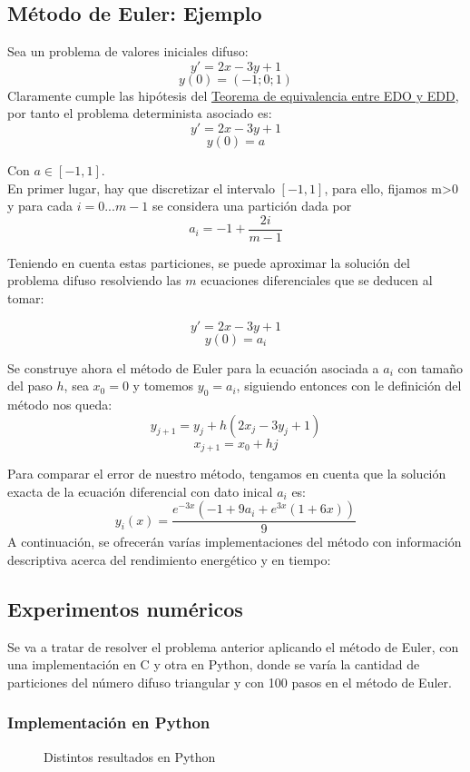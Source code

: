 \subsection{Método de Euler: Ejemplo}
\begin{ejemplo}
Sea un problema de valores iniciales difuso:
\[
y' = 2x - 3y + 1
\]
\[
y(0) = (-1;0;1)
\]
Claramente cumple las hipótesis del \hyperref[teorema:equivalencia]{Teorema de equivalencia entre EDO y EDD}, por tanto el problema determinista asociado es:
\[
y' = 2x - 3y + 1
\]
\[
y(0) = a
\]

Con $a \in [-1, 1]$. \\
En primer lugar, hay que discretizar el intervalo $[-1, 1]$, para ello, fijamos m>0 y para cada $i=0...m-1$ se considera una partición dada por 
\[
a_i = -1 + \frac{2i}{m-1}
\]

Teniendo en cuenta estas particiones, se puede aproximar la solución del problema difuso resolviendo las $m$ ecuaciones diferenciales que se deducen al tomar:

\[
y' = 2x - 3y + 1
\]
\[
y(0) = a_i
\]

Se construye ahora el método de Euler para la ecuación asociada a $a_i$ con tamaño del paso $h$, sea $x_0=0$ y tomemos $y_0 = a_i$, siguiendo entonces con le definición del método nos queda:
\[
y_{j+1} = y_j + h (2x_j - 3y_j + 1)
\]
\[
x_{j+1} = x_0 + hj
\]

Para comparar el error de nuestro método, tengamos en cuenta que la solución exacta de la ecuación diferencial con dato inical $a_i$ es:
\[
y_i(x) = \frac{e^{-3 x} (-1 + 9 a_i + e^{3 x}(1 + 6 x))}{9}
\]
A continuación, se ofrecerán varías implementaciones del método con información descriptiva acerca del rendimiento energético y en tiempo:

\subsection{Experimentos numéricos}
Se va a tratar de resolver el problema anterior aplicando el método de Euler, con una implementación en C y otra en Python, donde se varía la cantidad de particiones del número difuso triangular y con 100 pasos en el método de Euler.
\subsubsection{Implementación en Python}
\begin{figure}[H]
	\centering
	\caption{Distintos resultados en Python}
	\label{fig:eulerpython}
\end{figure}


\end{ejemplo}

